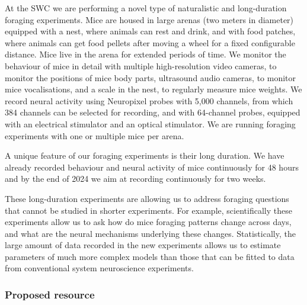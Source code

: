 At the SWC we are performing a novel type of naturalistic and long-duration
foraging experiments. Mice are housed in large arenas (two meters in diameter)
equipped with a nest, where animals can rest and drink, and with food patches,
where animals can get food pellets after moving a wheel for a fixed
configurable distance. Mice live in the arena for extended periods of time. We
monitor the behaviour of mice in detail with multiple high-resolution video
cameras, to monitor the positions of mice body parts, ultrasound audio cameras,
to monitor mice vocalisations, and a scale in the nest, to regularly measure
mice weights. We record neural activity using Neuropixel probes with 5,000
channels, from which 384 channels can be selected for recording, and with
64-channel probes, equipped with an electrical stimulator and an optical
stimulator.
%
We are running foraging experiments with one or multiple mice per arena.

A unique feature of our foraging experiments is their long duration. We have
already recorded behaviour and neural activity of mice continuously for 48 hours
and by the end of 2024 we aim at recording continuously for two weeks.

These long-duration experiments are allowing us to address foraging questions
that cannot be studied in shorter experiments. For example, scientifically
these experiments allow us to ask how do mice foraging patterns change across
days, and what are the neural mechanisms underlying these changes.
Statistically, the large amount of data recorded in the new experiments allows
us to estimate parameters of much more complex models than those that can be
fitted to data from conventional system neuroscience experiments.



\subsubsection*{Proposed resource}

